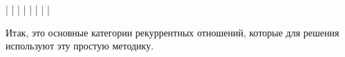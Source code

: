 \vspace{\baselineskip}
\begin{tcolorbox}

|\hspace{0,3mm}  \hspace{0,3mm}  \hspace{0,3mm}  \hspace{0,3mm}  \hspace*{0,3mm} |\newline
|\hspace*{0,3mm}  \hspace*{0,3mm}  \hspace*{0,3mm}  \hspace*{0,3mm}  \hspace*{0,3mm} |\newline
|\hspace*{0,3mm}  \hspace*{0,3mm}  \hspace*{0,3mm}  \hspace*{0,3mm}  \hspace*{0,3mm} |\newline
|\hspace*{0,3mm}  \hspace*{0,3mm}  \hspace*{0,3mm}  \hspace*{0,3mm}  \hspace*{0,3mm} |
\end{tcolorbox}
\vspace{\baselineskip}
Итак, это основные категории рекуррентных отношений, которые для решения используют эту простую методику.

